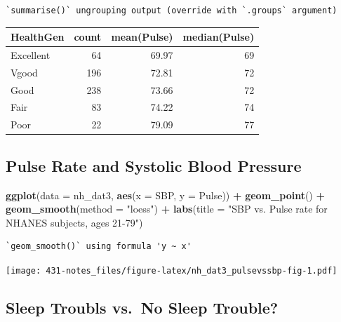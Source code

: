 \documentclass[
]{book}
\newenvironment{Shaded}{\begin{snugshade}}{\end{snugshade}}
\newcommand{\DataTypeTok}[1]{\textcolor[rgb]{0.13,0.29,0.53}{#1}}
\newcommand{\KeywordTok}[1]{\textcolor[rgb]{0.13,0.29,0.53}{\textbf{#1}}}
\newcommand{\NormalTok}[1]{#1}
\newcommand{\OperatorTok}[1]{\textcolor[rgb]{0.81,0.36,0.00}{\textbf{#1}}}
\newcommand{\StringTok}[1]{\textcolor[rgb]{0.31,0.60,0.02}{#1}}
\begin{document}
\begin{verbatim}
`summarise()` ungrouping output (override with `.groups` argument)
\end{verbatim}

\begin{tabular}{l|r|r|r}
\hline
HealthGen & count & mean(Pulse) & median(Pulse)\\
\hline
Excellent & 64 & 69.97 & 69\\
\hline
Vgood & 196 & 72.81 & 72\\
\hline
Good & 238 & 73.66 & 72\\
\hline
Fair & 83 & 74.22 & 74\\
\hline
Poor & 22 & 79.09 & 77\\
\hline
\end{tabular}

\hypertarget{pulse-rate-and-systolic-blood-pressure}{%
\subsection{Pulse Rate and Systolic Blood Pressure}\label{pulse-rate-and-systolic-blood-pressure}}

\begin{Shaded}
\begin{Highlighting}[]
\KeywordTok{ggplot}\NormalTok{(}\DataTypeTok{data =}\NormalTok{ nh_dat3, }\KeywordTok{aes}\NormalTok{(}\DataTypeTok{x =}\NormalTok{ SBP, }\DataTypeTok{y =}\NormalTok{ Pulse)) }\OperatorTok{+}
\StringTok{    }\KeywordTok{geom_point}\NormalTok{() }\OperatorTok{+}
\StringTok{    }\KeywordTok{geom_smooth}\NormalTok{(}\DataTypeTok{method =} \StringTok{"loess"}\NormalTok{) }\OperatorTok{+}
\StringTok{    }\KeywordTok{labs}\NormalTok{(}\DataTypeTok{title =} \StringTok{"SBP vs. Pulse rate for NHANES subjects, ages 21-79"}\NormalTok{)}
\end{Highlighting}
\end{Shaded}

\begin{verbatim}
`geom_smooth()` using formula 'y ~ x'
\end{verbatim}

\texttt{[image: 431-notes\_files/figure-latex/nh\_dat3\_pulsevssbp-fig-1.pdf]}

\hypertarget{sleep-troubls-vs.-no-sleep-trouble}{%
\subsection{Sleep Troubls vs.~No Sleep Trouble?}\label{sleep-troubls-vs.-no-sleep-trouble}}
\end{document}
